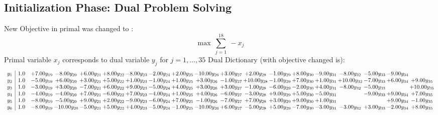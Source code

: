 \documentclass[9pt]{article}
\begin{document}
\subsection{Initialization Phase: Dual Problem Solving}
New Objective in primal was changed to : \[ \max\ \sum_{j=1}^{18}\ - x_j \] 
Primal variable $x_j$ corresponds to dual variable $y_j$ for $j = 1,\ldots,35$
Dual Dictionary (with objective changed is): 
\[\begin{array}{c| c c@{\hskip 2pt} c@{\hskip 2pt} c@{\hskip 2pt} c@{\hskip 2pt} c@{\hskip 2pt} c@{\hskip 2pt} c@{\hskip 2pt} c@{\hskip 2pt} c@{\hskip 2pt} c@{\hskip 2pt} c@{\hskip 2pt} c@{\hskip 2pt} c@{\hskip 2pt} c@{\hskip 2pt} c@{\hskip 2pt} c@{\hskip 2pt} c@{\hskip 2pt} }
 y_{1}   &  1.0 & +  7.00 y_{19} & -8.00 y_{20} & +  6.00 y_{21} & +  8.00 y_{22} & -8.00 y_{23} & -2.00 y_{24} & +  2.00 y_{25} & -10.00 y_{26} & +  3.00 y_{27} & +  2.00 y_{28} & -1.00 y_{29} & +  8.00 y_{30} & -9.00 y_{31} & -8.00 y_{32} & -5.00 y_{33} & -9.00 y_{34} &   \\
 y_{2}   &  1.0 & -5.00 y_{19} & +  6.00 y_{20} & +  3.00 y_{21} & +  5.00 y_{22} & +  1.00 y_{23} & -1.00 y_{24} & +  1.00 y_{25} & +  3.00 y_{26} & -1.00 y_{27} & + 10.00 y_{28} & -1.00 y_{29} & +  7.00 y_{30} & +  1.00 y_{31} & + 10.00 y_{32} & -7.00 y_{33} & +  6.00 y_{34} & +  9.00 y_{35}\\
 y_{3}   &  1.0 & -3.00 y_{19} & +  3.00 y_{20} & -7.00 y_{21} & +  6.00 y_{22} & +  9.00 y_{23} & -5.00 y_{24} & +  4.00 y_{25} & +  3.00 y_{26} & +  3.00 y_{27} & -1.00 y_{28} & -6.00 y_{29} & -2.00 y_{30} & +  4.00 y_{31} & -8.00 y_{32} & -5.00 y_{33} &   & + 10.00 y_{35}\\
 y_{4}   &  1.0 & -4.00 y_{19} & -4.00 y_{20} & +  7.00 y_{21} & -6.00 y_{22} & +  7.00 y_{23} & -4.00 y_{24} & +  1.00 y_{25} & +  4.00 y_{26} & -6.00 y_{27} & -3.00 y_{28} & +  9.00 y_{29} & +  5.00 y_{30} & -5.00 y_{31} &   & -9.00 y_{33} & +  9.00 y_{34} & +  7.00 y_{35}\\
 y_{5}   &  1.0 & -8.00 y_{19} & -5.00 y_{20} & +  9.00 y_{21} & +  2.00 y_{22} & -9.00 y_{23} & -6.00 y_{24} & +  7.00 y_{25} & -1.00 y_{26} & -7.00 y_{27} & +  7.00 y_{28} & +  3.00 y_{29} & +  9.00 y_{30} & +  1.00 y_{31} &    &   & +  9.00 y_{34} & -1.00 y_{35}\\
 y_{6}   &  1.0 & -8.00 y_{19} & -10.00 y_{20} & -5.00 y_{21} & +  5.00 y_{22} & +  4.00 y_{23} & -5.00 y_{24} & -1.00 y_{25} & -10.00 y_{26} & +  6.00 y_{27} & -5.00 y_{28} & +  5.00 y_{29} & -7.00 y_{30} & -3.00 y_{31} & -3.00 y_{32} & +  3.00 y_{33} & -2.00 y_{34} & +  8.00 y_{35}\\

\end{array}\]
\end{document}
